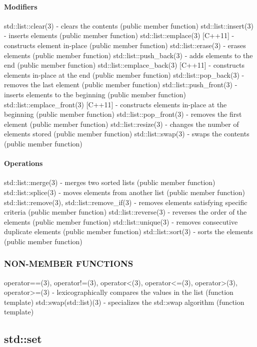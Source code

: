 \paragraph{Modifiers}
std::list::clear(3) - clears the contents   (public member function)
std::list::insert(3) - inserts elements   (public member function)
std::list::emplace(3) [C++11] - constructs element in-place   (public member function)
std::list::erase(3) - erases elements   (public member function)
std::list::push\_back(3) - adds elements to the end  (public member function)
std::list::emplace\_back(3) [C++11] - constructs elements in-place at the end   (public member function)
std::list::pop\_back(3) - removes the last element   (public member function)
std::list::push\_front(3) - inserts elements to the beginning  (public member function)
std::list::emplace\_front(3) [C++11] - constructs elements in-place at the beginning   (public member function)
std::list::pop\_front(3) - removes the first element   (public member function)
std::list::resize(3) - changes the number of elements stored   (public member function)
std::list::swap(3) - swaps the contents   (public member function)
\paragraph{Operations}
std::list::merge(3) - merges two sorted lists  (public member function)
std::list::splice(3) - moves elements from another list   (public member function)
std::list::remove(3), std::list::remove\_if(3) - removes elements satisfying specific criteria  (public member function)
std::list::reverse(3) - reverses the order of the elements  (public member function)
std::list::unique(3) - removes consecutive duplicate elements  (public member function)
std::list::sort(3) - sorts the elements  (public member function)

\subsubsection{NON-MEMBER FUNCTIONS}
operator==(3), operator!=(3), operator<(3), operator<=(3), operator>(3), operator>=(3) - lexicographically compares the values in the list   (function template)
std::swap(std::list)(3) - specializes the std::swap algorithm   (function template)


\subsection{std::set}

